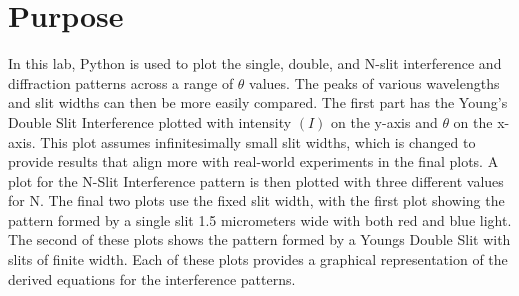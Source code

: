 \documentclass[12pt]{article}
\begin{document}

\newpage
\tableofcontents
\newpage
\section{Purpose}
In this lab, Python is used to plot the single, double, and N-slit interference and diffraction patterns across a range of $\theta$ values.
The peaks of various wavelengths and slit widths can then be more easily compared.
The first part has the Young's Double Slit Interference plotted with intensity $(I)$ on the y-axis and $\theta$ on the x-axis. 
This plot assumes infinitesimally small slit widths, which is changed to provide results that align more with real-world experiments in the final plots.
A plot for the N-Slit Interference pattern is then plotted with three different values for N. 
The final two plots use the fixed slit width, with the first plot showing the pattern formed by a single slit 1.5 micrometers wide with both red and blue light.
The second of these plots shows the pattern formed by a Youngs Double Slit with slits of finite width.
Each of these plots provides a graphical representation of the derived equations for the interference patterns.
\newpage
\end{document}
